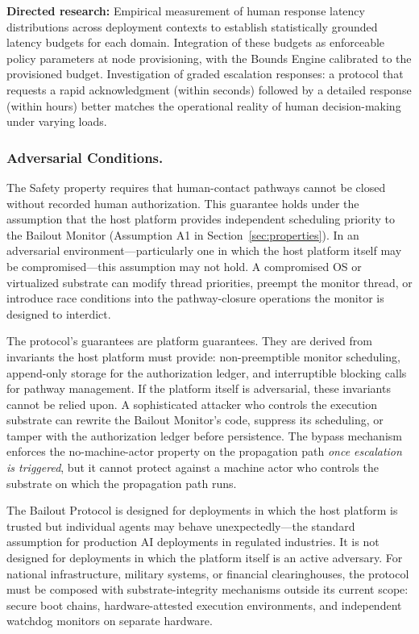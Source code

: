 \textbf{Directed research:} Empirical measurement of human response latency distributions across deployment contexts to establish statistically grounded latency budgets for each domain. Integration of these budgets as enforceable policy parameters at node provisioning, with the Bounds Engine calibrated to the provisioned budget. Investigation of graded escalation responses: a protocol that requests a rapid acknowledgment (within seconds) followed by a detailed response (within hours) better matches the operational reality of human decision-making under varying loads.

\subsubsection{Adversarial Conditions.}
The Safety property requires that human-contact pathways cannot be closed without recorded human authorization. This guarantee holds under the assumption that the host platform provides independent scheduling priority to the Bailout Monitor (Assumption A1 in Section~\ref{sec:properties}). In an adversarial environment---particularly one in which the host platform itself may be compromised---this assumption may not hold. A compromised OS or virtualized substrate can modify thread priorities, preempt the monitor thread, or introduce race conditions into the pathway-closure operations the monitor is designed to interdict.

The protocol's guarantees are platform guarantees. They are derived from invariants the host platform must provide: non-preemptible monitor scheduling, append-only storage for the authorization ledger, and interruptible blocking calls for pathway management. If the platform itself is adversarial, these invariants cannot be relied upon. A sophisticated attacker who controls the execution substrate can rewrite the Bailout Monitor's code, suppress its scheduling, or tamper with the authorization ledger before persistence. The bypass mechanism enforces the no-machine-actor property on the propagation path \emph{once escalation is triggered}, but it cannot protect against a machine actor who controls the substrate on which the propagation path runs.

The Bailout Protocol is designed for deployments in which the host platform is trusted but individual agents may behave unexpectedly---the standard assumption for production AI deployments in regulated industries. It is not designed for deployments in which the platform itself is an active adversary. For national infrastructure, military systems, or financial clearinghouses, the protocol must be composed with substrate-integrity mechanisms outside its current scope: secure boot chains, hardware-attested execution environments, and independent watchdog monitors on separate hardware.

